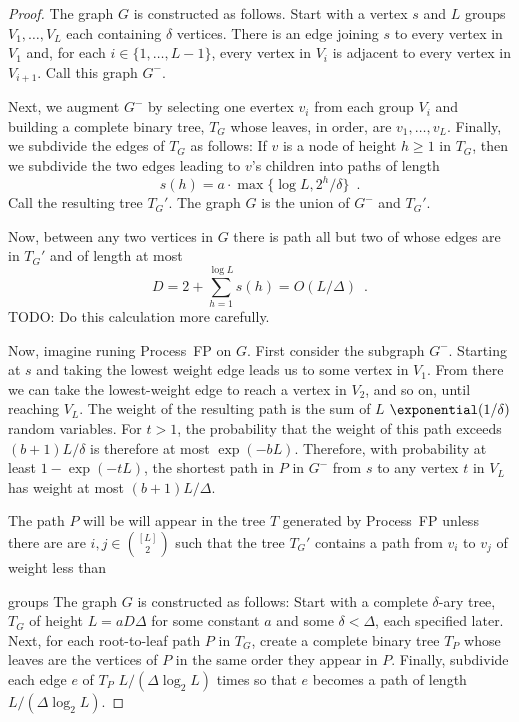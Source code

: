 \documentclass{patmorin}
\begin{document}
\begin{proof}
  The graph $G$ is constructed as follows.  Start with a vertex $s$ and
  $L$ groups $V_1,\ldots,V_L$ each containing $\delta$ vertices. There
  is an edge joining $s$ to every vertex in $V_1$ and, for each
  $i\in\{1,\ldots,L-1\}$, every vertex in $V_i$ is adjacent to every
  vertex in $V_{i+1}$.  Call this graph $G^-$.

  Next, we augment $G^-$ by selecting one evertex $v_i$ from each group
  $V_i$ and building a complete binary tree, $T_G$ whose leaves, in order,
  are $v_1,\ldots,v_L$.  Finally, we subdivide the edges of $T_G$ as follows:
  If $v$ is a node of height $h\ge 1$ in $T_G$, then we subdivide the two
  edges leading to $v$'s children into paths of length
  \[
      s(h) = a\cdot\max\{\log L, 2^h/\delta\} \enspace .
  \]
  Call the resulting tree $T_G'$.  The graph $G$ is the union of $G^-$ and $T_G'$.

  Now, between any two vertices in $G$ there is path all but two of
  whose edges are in $T_G'$ and of length at most
  \[
      D = 2+\sum_{h=1}^{\log L} s(h) = O(L/\Delta) \enspace .
  \]
  TODO: Do this calculation more carefully.

  Now, imagine runing Process~FP on $G$.  First consider the subgraph
  $G^-$.  Starting at $s$ and taking the lowest weight edge leads us to
  some vertex in $V_1$.  From there we can take the lowest-weight edge to
  reach a vertex in $V_2$, and so on, until reaching $V_L$.  The weight
  of the resulting path is the sum of $L$ $\exponential(1/\delta)$
  random variables.  For $t>1$, the probability that the weight of
  this path exceeds $(b+1)L/\delta$ is therefore at most $\exp(-bL)$.
  Therefore, with probability at least $1-\exp(-tL)$, the shortest path
  in $P$ in $G^-$ from $s$ to any vertex $t$ in $V_L$ has weight at
  most $(b+1)L/\Delta$.

  The path $P$ will be will appear in the tree $T$ generated by Process~FP
  unless there are are $i,j \in\binom{[L]}{2}$ such that the tree $T_G'$
  contains a path from $v_i$ to $v_j$ of weight less than


  


  groups   
  The graph $G$ is constructed as follows: Start with a complete
  $\delta$-ary tree, $T_G$ of height $L=aD\Delta$ for some constant $a$
  and some $\delta < \Delta$, each specified later.  Next, for each
  root-to-leaf path $P$ in $T_G$, create a complete binary tree $T_P$
  whose leaves are the vertices of $P$ in the same order they appear
  in $P$.  Finally, subdivide each edge $e$ of $T_P$  $L/(\Delta \log_2
  L)$ times so that $e$ becomes a path of length $L/(\Delta\log_2 L)$.


\end{proof}
\end{document}
